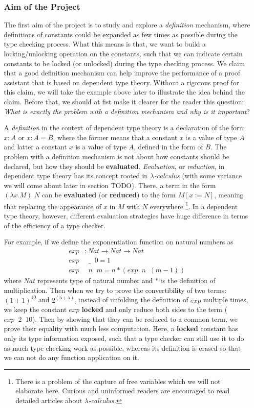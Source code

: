 \documentclass{article}
\theoremstyle{remark}
\begin{document}
\subsubsection{Aim of the Project}
The first aim of the project is to study and explore a \emph{definition} mechanism, where definitions of constants could be expanded as few times as possible during the type checking process. What this means is that, we want to build a locking/unlocking operation on the constants, such that we can indicate certain constants to be locked (or unlocked) during the type checking process. We claim that a good definition mechanism can help improve the performance of a proof assistant that is based on dependent type theory. Without a rigorous proof for this claim, we will take the example above later to illustrate the idea behind the claim. Before that, we should at fist make it clearer for the reader this question: \emph{What is exactly the problem with a definition mechanism and why is it important}?

A \emph{definition} in the context of dependent type theory is a declaration of the form $x : A$ or $x : A = B$, where the former means that a constant $x$ is a value of type $A$ and latter a constant $x$ is a value of type $A$, defined in the form of $B$. The problem with a definition mechanism is not about how constants should be declared, but how they should be \textbf{evaluated}. \emph{Evaluation}, or \emph{reduction}, in dependent type theory has its concept rooted in \emph{$\lambda$-calculus} \cite{barendregt1984lambda} (with some variance we will come about later in section TODO). There, a term in the form $(\lambda x . M) \;N$ can be \textbf{evaluated} (or \textbf{reduced}) to the form $M[x := N]$, meaning that replacing the appearance of $x$ in $M$ with $N$ everywhere \footnote{There is a problem of the capture of free variables which we will not elaborate here. Curious and uninformed readers are encouraged to read detailed articles about \emph{$\lambda$-calculus.}}. In a dependent type theory, however, different evaluation strategies have huge difference in terms of the efficiency of a type checker. 

For example, if we define the exponentiation function on natural numbers as
\begin{align*}
  exp &: Nat \to Nat \to Nat \\
  exp &\;\; \_\;\; 0 = 1 \\
  exp &\;\; n \;\; m = n * (exp \;\; n \;\; (m - 1))
\end{align*}
where $Nat$ represents type of natural number and $*$ is the definition of multiplication. Then when we try to prove the convertibility of two terms: $(1 + 1)^{10}$ and $2 ^ {(5+5)}$, instead of unfolding the definition of $exp$ multiple times, we keep the constant $exp$ \textbf{locked} and only reduce both sides to the term ($exp \;\; 2 \;\; 10$). Then by showing that they can be reduced to a common term, we prove their equality with much less computation. Here, a \textbf{locked} constant has only its type information exposed, such that a type checker can still use it to do as much type checking work as possible, whereas its definition is erased so that we can not do any function application on it.
\end{document}
